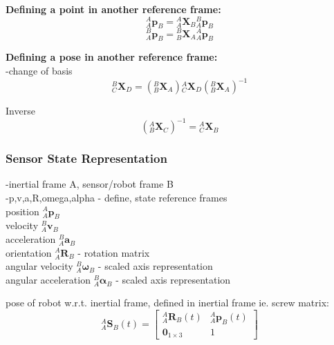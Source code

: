 		\textbf{Defining a point in another reference frame:}\\
		\begin{equation}
			{^{A}_{A}\mathbf{p}^{}_{B}} = {^{A}_{A}\mathbf{X}^{}_{B}}{^{B}_{A}\mathbf{p}^{}_{B}}
		\end{equation}
		\begin{equation}
			{^{B}_{A}\mathbf{p}^{}_{B}} = {^{B}_{B}\mathbf{X}^{}_{A}}{^{A}_{A}\mathbf{p}^{}_{B}}
		\end{equation}
		
		\textbf{Defining a pose in another reference frame:}\\
		-change of basis
		\begin{equation}
			{^{B}_{C}\mathbf{X}^{}_{D}} = ({^{B}_{B}\mathbf{X}^{}_{A}}){^{A}_{C}\mathbf{X}^{}_{D}}({^{B}_{B}\mathbf{X}^{}_{A}})^{-1}
		\end{equation}

		Inverse
		\begin{equation}
			({^{A}_{B}\mathbf{X}^{}_{C}})^{-1} = {^{A}_{C}\mathbf{X}^{}_{B}}
		\end{equation}
	
	\subsubsection{Sensor State Representation}
		-inertial frame A, sensor/robot frame  B\\
		-p,v,a,R,omega,alpha - define, state reference frames\\	
		position $^{A}_{A}\mathbf{p}^{}_{B}$\\
		velocity $^{B}_{A}\mathbf{v}^{}_{B}$\\
		acceleration $^{B}_{A}\mathbf{a}^{}_{B}$\\
		orientation $^{A}_{A}\mathbf{R}^{}_{B}$ - rotation matrix\\
		angular velocity $^{B}_{A}\mathbf{\omega}^{}_{B}$ - scaled axis representation\\
		angular acceleration $^{B}_{A}\mathbf{\alpha}^{}_{B}$ - scaled axis representation
		
		pose of robot w.r.t. inertial frame, defined in inertial frame ie. screw matrix:
		\begin{equation}
				{^{A}_{A}\mathbf{S}^{}_{B}(t)} = 
				\begin{bmatrix}
						  ^{A}_{A}\mathbf{R}^{}_{B}(t) 	& 	^{A}_{A}\mathbf{p}^{}_{B}(t)\\
						  \textbf{0}_{1 \times 3} & 1						  
				\end{bmatrix}
		\end{equation}
		
